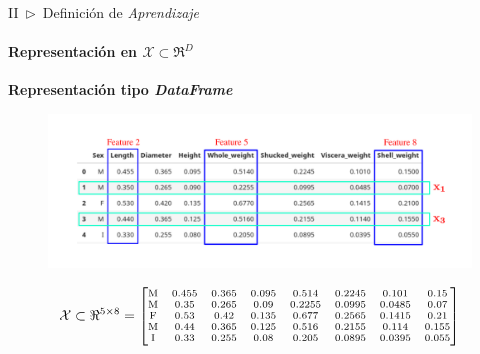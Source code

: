 \documentclass[xcolor=dvipsnames]{beamer}
\begin{document}
    \begin{frame}{II~$\rhd$~Definición de \textit{Aprendizaje}}
    \framesubtitle{Representación en $\mathcal{X}\subset\Re^{D}$}
        \textbf{\Large{Representación tipo \textit{DataFrame}}}
        \begin{figure}
            \centering
            \includegraphics[width=\linewidth]{imgs/def01/taskSpace02.png}
        \end{figure}
        \begin{equation*}
        \scriptsize{
            \mathcal{X}\subset\Re^{5\times 8} = \begin{bmatrix}
            \text{M} & 0.455 & 0.365 & 0.095 & 0.514 & 0.2245 & 0.101 & 0.15 \\
            \text{M} & 0.35 & 0.265 & 0.09 & 0.2255 & 0.0995 & 0.0485 & 0.07 \\
            \text{F} & 0.53 & 0.42 & 0.135 & 0.677 & 0.2565 & 0.1415 & 0.21 \\
            \text{M} & 0.44 & 0.365 & 0.125 & 0.516 & 0.2155 & 0.114 & 0.155 \\
            \text{I} & 0.33 & 0.255 & 0.08 & 0.205 & 0.0895 & 0.0395 & 0.055
            \end{bmatrix}
        }
        \end{equation*}
    \end{frame}
\end{document}
